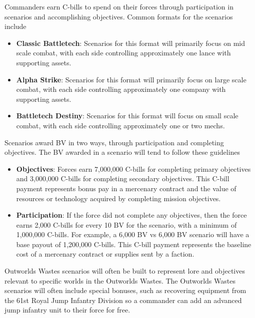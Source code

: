 \documentclass[UTF8]{article}
\begin{document}
Commanders earn C-bills to spend on their forces through participation in scenarios and accomplishing objectives.
Common formats for the scenarios include

\begin{itemize}

\item {\bf Classic Battletech}: Scenarios for this format will primarily focus on mid scale combat, with each side controlling approximately one lance with supporting assets.

\item {\bf Alpha Strike}: Scenarios for this format will primarily focus on large scale combat, with each side controlling approximately one company with supporting assets.

\item {\bf Battletech Destiny}: Scenarios for this format will focus on small scale combat, with each side controlling approximately one or two mechs.

\end{itemize}

Scenarios award BV in two ways, through participation and completing objectives.
The BV awarded in a scenario will tend to follow these guidelines

\begin{itemize}

\item {\bf Objectives}: Forces earn 7,000,000 C-bills for completing primary objectives and 3,000,000 C-bills for completing secondary objectives.
This C-bill payment represents bonus pay in a mercenary contract and the value of resources or technology acquired by completing mission objectives.

\item {\bf Participation}: If the force did not complete any objectives, then the force earns 2,000 C-bills for every 10 BV for the scenario, with a minimum of 1,000,000 C-bills.
For example, a 6,000 BV vs 6,000 BV scenario will have a base payout of 1,200,000 C-bills.
This C-bill payment represents the baseline cost of a mercenary contract or supplies sent by a faction.

\end{itemize}

Outworlds Wastes scenarios will often be built to represent lore and objectives relevant to specific worlds in the Outworlds Wastes.
The Outworlds Wastes scenarios will often include special bonuses, such as recovering equipment from the 61st Royal Jump Infantry Division so a commander can add an advanced jump infantry unit to their force for free.\\
\end{document}
